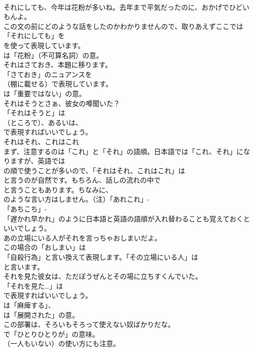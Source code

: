 \documentclass[8pt]{extreport}
\begin{document}
\begin{CJK}{UTF8}{min}
\\	それにしても、今年は花粉が多いね。去年まで平気だったのに、おかげでひどいもんよ。 
\\	この文の前にどのような話をしたのかわかりませんので、取りあえずここでは「それにしても」を
\\	を使って表現しています。
\\	は「花粉」（不可算名詞）の意。	
\\	それはさておき、本題に移ります。 
\\	「さておき」のニュアンスを 
\\	（棚に載せる）で表現しています。
\\	は「重要ではない」の意。	
\\	それはそうとさぁ、彼女の噂聞いた？ 
\\	「それはそうと」は 
\\	（ところで）、あるいは、
\\	で表現すればいいでしょう。	
\\	それはそれ、これはこれ 
\\	まず、注意するのは「これ」と「それ」の語順。日本語では「これ、それ」になりますが、英語では
\\	の順で使うことが多いので、「それはそれ、これはこれ」は
\\	と言うのが自然です。もちろん、話しの流れの中で
\\	と言うこともあります。ちなみに、
\\	のような言い方はしません。（注）「あれこれ」- 
\\	「あちこち」- 
\\	「遅かれ早かれ」のように日本語と英語の語順が入れ替わることも覚えておくといいでしょう。	
\\	あの立場にいる人がそれを言っちゃおしまいだよ。 
\\	この場合の「おしまい」は
\\	「自殺行為」と言い換えて表現します。「その立場にいる人」は
\\	と言います。	
\\	それを見た彼女は、ただぼうぜんとその場に立ちすくんでいた。 
\\	「それを見た…」は 
\\	で表現すればいいでしょう。 
\\	は「麻痺する」、
\\	は「展開された」の意。	
\\	この部署は、そろいもそろって使えない奴ばかりだな。 
\\	で「ひとりひとりが」の意味。
\\	（一人もいない）の使い方にも注意。	

\end{CJK}
\end{document}
